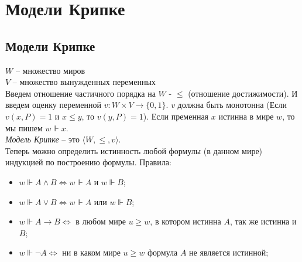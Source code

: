 \section{Модели Крипке}
\label{sec-6}
\subsection{Модели Крипке}
\label{sec-6-1}
$W$ -- множество миров\\
$V$ -- множество вынужденных переменных\\
Введем отношение частичного порядка на $W$ - $\leq$ (отношение достижимости). И введем оценку переменной $v: W \times V \rightarrow \lbrace 0, 1 \rbrace$. $v$ должна быть монотонна (Если $v(x, P) = 1$ и $x \leq y$, то $v(y, P) = 1$). Если пременная $x$ истинна в мире $w$, то мы пишем $w \Vdash x$.\\
\emph{Модель Крипке} -- это $\langle W, \leq, v\rangle$.\\
Теперь можно определить истинность любой формулы (в данном мире) индукцией по построению формулы. Правила:
\begin{itemize}
\item $w \Vdash A \land B \Leftrightarrow w \Vdash A$ и $w \Vdash B$;
\item $w \Vdash A \vee B \Leftrightarrow w \Vdash A$ или $w \Vdash B$;
\item $w \Vdash A \rightarrow B \Leftrightarrow$ в любом мире $u \geq w$, в котором истинна $A$, так же истинна и $B$;
\item $w \Vdash \neg A \Leftrightarrow$ ни в каком мире $u \geq w$ формула $A$ не является истинной;
\end{itemize}
